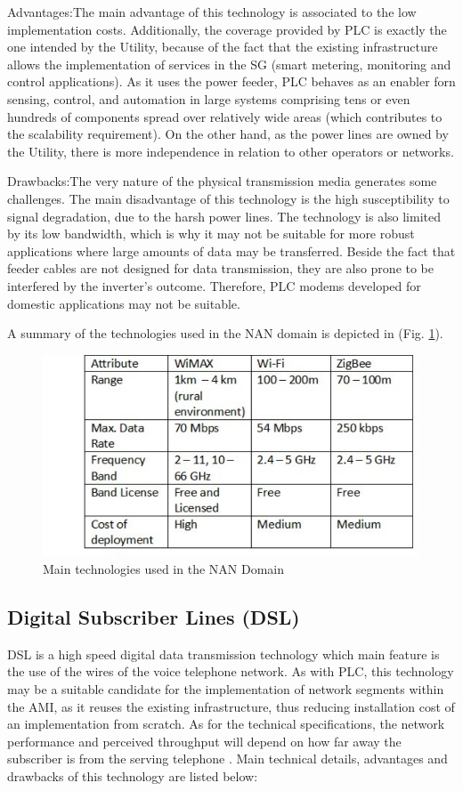 \documentclass[11pt,final,onecolumn]{IEEEtran}
\begin{document}
Advantages:The main advantage of this technology is associated to the low implementation costs. Additionally, the coverage provided by PLC is exactly the one intended by the Utility, because of the fact that the existing infrastructure allows the implementation of services in the SG (smart metering, monitoring and control applications). As it uses the power feeder, PLC behaves as an enabler forn sensing, control, and automation in large systems comprising tens or even hundreds of components spread over relatively wide areas (which contributes to the scalability requirement). On the other hand, as the power lines are owned by the Utility, there is more independence in relation to other operators or networks. 

Drawbacks:The very nature of the physical transmission media generates some challenges. The main disadvantage of this technology is the high susceptibility to signal degradation, due to the harsh power lines. The technology is also limited by its low bandwidth, which is why it may not be suitable for more robust applications where large amounts of data may be transferred. Beside the fact that feeder cables are not designed for data transmission, they are also prone to be interfered by the inverter’s outcome. Therefore, PLC modems developed for domestic applications may not be suitable. 

A summary of the technologies used in the NAN domain is depicted in (Fig. \ref{fig:nan}).

\begin{figure}[h!]
\centering
\includegraphics [height=6cm] {NANTechnologies}
\caption{Main technologies used in the NAN Domain}
\label{fig:nan}
\end{figure}


\subsection{Digital Subscriber Lines (DSL)}\label{dsl}
DSL is a high speed digital data transmission technology which main feature is the use of the wires of the voice telephone network. As with PLC, this technology may be a suitable candidate for the implementation of network segments within the AMI, as it reuses the existing infrastructure, thus reducing installation cost of an implementation from scratch. As for the technical specifications, the network performance and perceived throughput will depend on how far away the subscriber is from the serving telephone  \cite{Gungor2011}. Main technical details, advantages and drawbacks of this technology are listed below:
\end{document}
